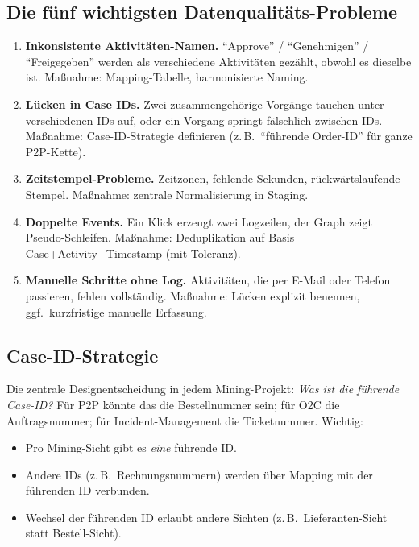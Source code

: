 \documentclass[11pt,a4paper,oneside]{article}
\newcommand{\fachbegriff}[1]{\textbf{#1}}
\begin{document}
\subsection{Die fünf wichtigsten Datenqualitäts-Probleme}

\begin{enumerate}
  \item \fachbegriff{Inkonsistente Aktivitäten-Namen.} ``Approve'' / ``Genehmigen'' / ``Freigegeben'' werden als verschiedene Aktivitäten gezählt, obwohl es dieselbe ist. Maßnahme: Mapping-Tabelle, harmonisierte Naming.
  \item \fachbegriff{Lücken in Case IDs.} Zwei zusammengehörige Vorgänge tauchen unter verschiedenen IDs auf, oder ein Vorgang springt fälschlich zwischen IDs. Maßnahme: Case-ID-Strategie definieren (z.\,B.\ ``führende Order-ID'' für ganze P2P-Kette).
  \item \fachbegriff{Zeitstempel-Probleme.} Zeitzonen, fehlende Sekunden, rückwärtslaufende Stempel. Maßnahme: zentrale Normalisierung in Staging.
  \item \fachbegriff{Doppelte Events.} Ein Klick erzeugt zwei Logzeilen, der Graph zeigt Pseudo-Schleifen. Maßnahme: Deduplikation auf Basis Case+Activity+Timestamp (mit Toleranz).
  \item \fachbegriff{Manuelle Schritte ohne Log.} Aktivitäten, die per E-Mail oder Telefon passieren, fehlen vollständig. Maßnahme: Lücken explizit benennen, ggf.\ kurzfristige manuelle Erfassung.
\end{enumerate}

\subsection{Case-ID-Strategie}

Die zentrale Designentscheidung in jedem Mining-Projekt: \emph{Was ist die führende Case-ID?} Für P2P könnte das die Bestellnummer sein; für O2C die Auftragsnummer; für Incident-Management die Ticketnummer. Wichtig:

\begin{itemize}
  \item Pro Mining-Sicht gibt es \emph{eine} führende ID.
  \item Andere IDs (z.\,B.\ Rechnungsnummern) werden über Mapping mit der führenden ID verbunden.
  \item Wechsel der führenden ID erlaubt andere Sichten (z.\,B.\ Lieferanten-Sicht statt Bestell-Sicht).
\end{itemize}
\end{document}
